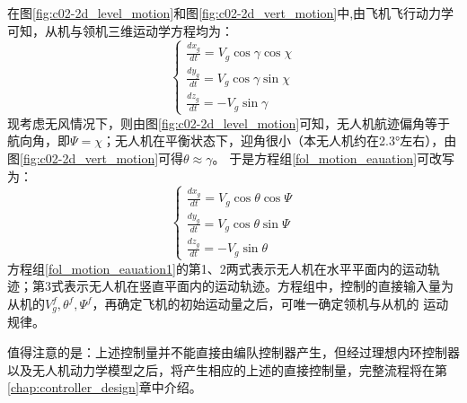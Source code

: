 在图\ref{fig:c02-2d_level_motion}和图\ref{fig:c02-2d_vert_motion}中,由飞机飞行动力学可知，从机与领机三维运动学方程均为：
\begin{equation}
    \left\{
    \begin{array}{l}
        \frac{dx_g}{dt}=V_g\cos\gamma\cos\chi\\
        \frac{dy_g}{dt}=V_g\cos\gamma\sin\chi\\
        \frac{dz_g}{dt}=-V_g\sin\gamma
    \end{array}
    \right .
    \label{fol_motion_eauation}
\end{equation}
现考虑无风情况下，则由图\ref{fig:c02-2d_level_motion}可知，无人机航迹偏角等于航向角，即$\Psi=\chi$；无人机在平衡状态下，迎角很小（本无人机约在2.3°左右），由图\ref{fig:c02-2d_vert_motion}可得$\theta\approx\gamma$。
于是方程组\ref{fol_motion_eauation}可改写为：
\begin{equation}
    \left\{
    \begin{array}{l}
        \frac{dx_g}{dt}=V_g\cos\theta\cos\Psi\\
        \frac{dy_g}{dt}=V_g\cos\theta\sin\Psi\\
        \frac{dz_g}{dt}=-V_g\sin\theta
    \end{array}
    \right .
    \label{fol_motion_eauation1}
\end{equation}
方程组\ref{fol_motion_eauation1}的第1、2两式表示无人机在水平平面内的运动轨迹；第3式表示无人机在竖直平面内的运动轨迹。方程组中，控制的直接输入量为从机的$V_{g}^f,\theta^f,\Psi^f$，再确定飞机的初始运动量之后，可唯一确定领机与从机的
运动规律。

值得注意的是：上述控制量并不能直接由编队控制器产生，但经过理想内环控制器以及无人机动力学模型之后，将产生相应的上述的直接控制量，完整流程将在第\ref{chap:controller_design}章中介绍。